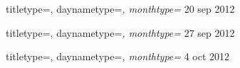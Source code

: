 \documentclass{evweek}
\begin{document}
\begin{weekly}
  {titletype=\mdseries, daynametype=\itshape, monthtype=\scshape}
  {}
  20 sep 2012
\end{weekly}
\begin{weekly}
  {titletype=\mdseries, daynametype=\itshape, monthtype=\scshape}
  {}
  27 sep 2012
\end{weekly}
\begin{weekly}
  {titletype=\mdseries, daynametype=\itshape, monthtype=\scshape}
  {}
  4 oct 2012
\end{weekly}
\end{document}
